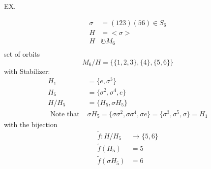 \documentclass{article}
\begin{document}
EX. 
\begin{example}
    \begin{align*}
        \sigma &= (123)(56) \in S_6 \\
        H &= <\sigma> \\ 
        H &\circlearrowright M_6 \\
    \end{align*}
    set of orbits $$M_6 / H =  \{ \{1,2,3\}, \{4\}, \{5,6\} \}$$
    with Stabilizer: \begin{align*}
        H_{1} & = \{e, \sigma^3\} \\
        H_{5} & = \{\sigma^2, \sigma^4, e\} \\
        H / H_{5} &= \{H_{5}, \sigma H_{5}\}\\ 
        \text{ Note that } & \sigma H_{5} = \{\sigma \sigma^2, \sigma \sigma^4, \sigma e\} = \{\sigma^3, \sigma^5, \sigma\} = H_{1}
    \end{align*} 
    with the bijection
    \begin{align*}
        \tilde{f}: H / H_{5} &\to \{5,6\} \\ 
        \tilde{f}(H_{5}) &= 5 \\
        \tilde{f}(\sigma H_{5}) &= 6
    \end{align*}
\end{example}
\end{document}
